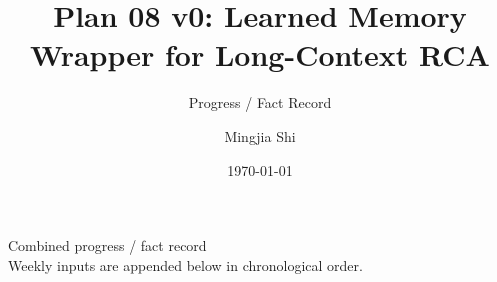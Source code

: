 \documentclass[aspectratio=169]{beamer}
\title[Plan 08 v0]{Plan 08 v0: Learned Memory Wrapper for Long-Context RCA}
\subtitle{Progress / Fact Record}
\author{Mingjia Shi}
\institute{RCA Foundation Model / Long-Context Memory}
\date{\today}
\begin{document}
\begin{frame}
  \titlepage
  \vspace{-1.0em}
  \begin{center}
    \small Combined progress / fact record \\
    \scriptsize Weekly inputs are appended below in chronological order.
  \end{center}
\end{frame}







\end{document}

